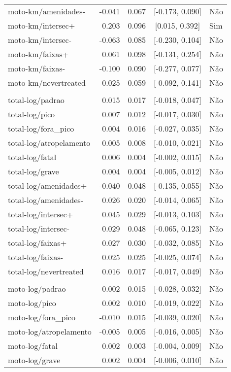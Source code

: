 \begin{longtable}{lrrcl}
moto-km/amenidades- & -0.041 & 0.067 & {}[-0.173, 0.090] & Não\\
moto-km/intersec+ & 0.203 & 0.096 & {}[0.015, 0.392] & Sim\\
moto-km/intersec- & -0.063 & 0.085 & {}[-0.230, 0.104] & Não\\
moto-km/faixas+ & 0.061 & 0.098 & {}[-0.131, 0.254] & Não\\
moto-km/faixas- & -0.100 & 0.090 & {}[-0.277, 0.077] & Não\\
moto-km/nevertreated & 0.025 & 0.059 & {}[-0.092, 0.141] & Não\\
 &  &  &  & \\
total-log/padrao & 0.015 & 0.017 & {}[-0.018, 0.047] & Não\\
total-log/pico & 0.007 & 0.012 & {}[-0.017, 0.030] & Não\\
total-log/fora\_pico & 0.004 & 0.016 & {}[-0.027, 0.035] & Não\\
total-log/atropelamento & 0.005 & 0.008 & {}[-0.010, 0.021] & Não\\
total-log/fatal & 0.006 & 0.004 & {}[-0.002, 0.015] & Não\\
total-log/grave & 0.004 & 0.004 & {}[-0.005, 0.012] & Não\\
total-log/amenidades+ & -0.040 & 0.048 & {}[-0.135, 0.055] & Não\\
total-log/amenidades- & 0.026 & 0.020 & {}[-0.014, 0.065] & Não\\
total-log/intersec+ & 0.045 & 0.029 & {}[-0.013, 0.103] & Não\\
total-log/intersec- & 0.029 & 0.048 & {}[-0.065, 0.123] & Não\\
total-log/faixas+ & 0.027 & 0.030 & {}[-0.032, 0.085] & Não\\
total-log/faixas- & 0.025 & 0.025 & {}[-0.025, 0.074] & Não\\
total-log/nevertreated & 0.016 & 0.017 & {}[-0.017, 0.049] & Não\\
 &  &  &  & \\
moto-log/padrao & 0.002 & 0.015 & {}[-0.028, 0.032] & Não\\
moto-log/pico & 0.002 & 0.010 & {}[-0.019, 0.022] & Não\\
moto-log/fora\_pico & -0.010 & 0.015 & {}[-0.039, 0.020] & Não\\
moto-log/atropelamento & -0.005 & 0.005 & {}[-0.016, 0.005] & Não\\
moto-log/fatal & 0.002 & 0.003 & {}[-0.004, 0.009] & Não\\
moto-log/grave & 0.002 & 0.004 & {}[-0.006, 0.010] & Não\\

\end{longtable}
